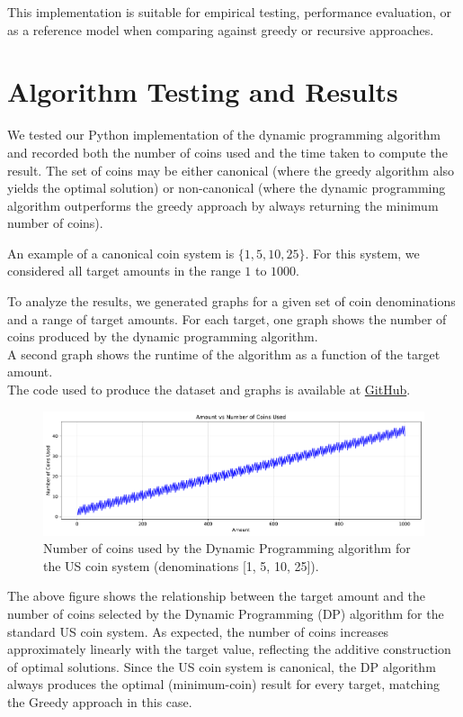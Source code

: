 \documentclass[12pt,a4paper]{report}
\begin{document}
This implementation is suitable for empirical testing, performance evaluation, or as a reference model when comparing against greedy or recursive approaches.


\section{Algorithm Testing and Results}

We tested our Python implementation of the dynamic programming algorithm and recorded both 
the number of coins used and the time taken to compute the result. The set of 
coins may be either canonical (where the greedy algorithm also yields the 
optimal solution) or non-canonical (where the dynamic programming algorithm 
outperforms the greedy approach by always returning the minimum number of coins).

An example of a canonical coin system is 
\(\{1, 5, 10, 25\}\). For this system, we considered all target amounts in the 
range \(1\) to \(1000\).

To analyze the results, we generated graphs for a given set of coin denominations and a range of target amounts. 
For each target, one graph shows the number of coins produced by the dynamic programming algorithm.\\
A second graph shows the runtime of the algorithm as a function of the target amount. \\
The code used to produce the dataset and graphs is available at \href{https://github.com/ItzKanashii/Coin-Change/tree/main/projectFile}{GitHub}. %

\begin{figure}[H]
  \centering
  \includegraphics[width=\textwidth]{graphs/dp_coins_standard_plot.pdf}
  \caption{Number of coins used by the Dynamic Programming algorithm for the US coin system (denominations [1, 5, 10, 25]).}
  \label{fig:dp_coins_standard_plot}
\end{figure}

The above figure shows the relationship between the target amount and the number of coins selected by the Dynamic Programming (DP) algorithm for the standard US coin system. As expected, the number of coins increases approximately linearly with the target value, reflecting the additive construction of optimal solutions. Since the US coin system is canonical, the DP algorithm always produces the optimal (minimum-coin) result for every target, matching the Greedy approach in this case.
\end{document}
